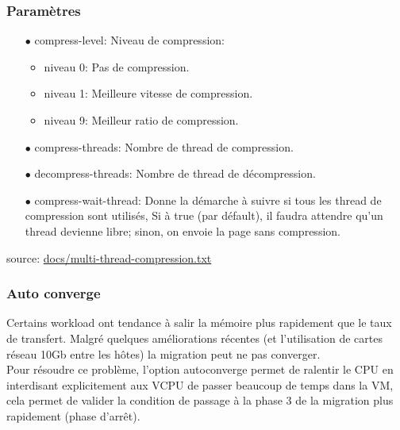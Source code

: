\subsubsection*{Paramètres}
\begin{itemize}

    \item[$\bullet$] compress-level: Niveau de compression:
        \begin{itemize}
            \item niveau 0: Pas de compression.
            \item niveau 1: Meilleure vitesse de compression.
            \item niveau 9: Meilleur ratio de compression.
        \end{itemize}

    \item[$\bullet$] compress-threads: Nombre de thread de compression.
    \item[$\bullet$] decompress-threads: Nombre de thread de décompression.
    \item[$\bullet$] compress-wait-thread: Donne la démarche à suivre si tous les thread de compression sont utilisés, Si à true (par défault), il faudra attendre qu'un thread devienne libre; sinon, on envoie la page sans compression.
\end{itemize}

source:  \url{docs/multi-thread-compression.txt}

\subsubsection*{Auto converge}
Certains workload ont tendance à salir la mémoire plus rapidement que le taux de transfert.
Malgré quelques améliorations récentes (et l'utilisation de cartes réseau 10Gb entre les hôtes) la migration peut ne pas converger.
\\

Pour résoudre ce problème, l'option autoconverge permet de ralentir le CPU en interdisant
explicitement aux VCPU de passer beaucoup de temps dans la VM, cela permet de valider la condition de passage
à la phase 3 de la migration plus rapidement (phase d'arrêt).

